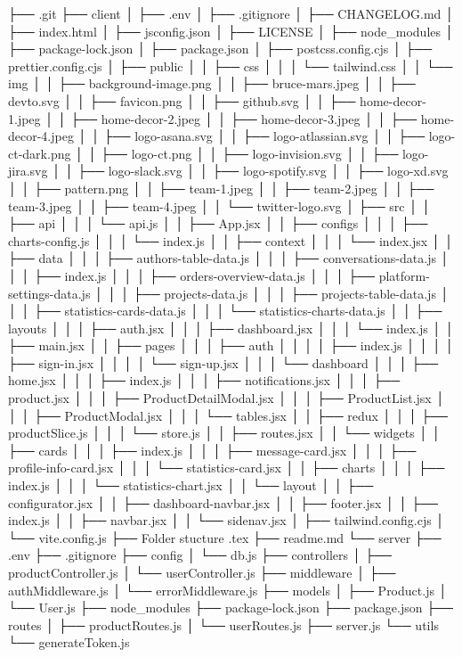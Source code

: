 ├── .git
├── client
│   ├── .env
│   ├── .gitignore
│   ├── CHANGELOG.md
│   ├── index.html
│   ├── jsconfig.json
│   ├── LICENSE
│   ├── node_modules
│   ├── package-lock.json
│   ├── package.json
│   ├── postcss.config.cjs
│   ├── prettier.config.cjs
│   ├── public
│   │   ├── css
│   │   │   └── tailwind.css
│   │   └── img
│   │       ├── background-image.png
│   │       ├── bruce-mars.jpeg
│   │       ├── devto.svg
│   │       ├── favicon.png
│   │       ├── github.svg
│   │       ├── home-decor-1.jpeg
│   │       ├── home-decor-2.jpeg
│   │       ├── home-decor-3.jpeg
│   │       ├── home-decor-4.jpeg
│   │       ├── logo-asana.svg
│   │       ├── logo-atlassian.svg
│   │       ├── logo-ct-dark.png
│   │       ├── logo-ct.png
│   │       ├── logo-invision.svg
│   │       ├── logo-jira.svg
│   │       ├── logo-slack.svg
│   │       ├── logo-spotify.svg
│   │       ├── logo-xd.svg
│   │       ├── pattern.png
│   │       ├── team-1.jpeg
│   │       ├── team-2.jpeg
│   │       ├── team-3.jpeg
│   │       ├── team-4.jpeg
│   │       └── twitter-logo.svg
│   ├── src
│   │   ├── api
│   │   │   └── api.js
│   │   ├── App.jsx
│   │   ├── configs
│   │   │   ├── charts-config.js
│   │   │   └── index.js
│   │   ├── context
│   │   │   └── index.jsx
│   │   ├── data
│   │   │   ├── authors-table-data.js
│   │   │   ├── conversations-data.js
│   │   │   ├── index.js
│   │   │   ├── orders-overview-data.js
│   │   │   ├── platform-settings-data.js
│   │   │   ├── projects-data.js
│   │   │   ├── projects-table-data.js
│   │   │   ├── statistics-cards-data.js
│   │   │   └── statistics-charts-data.js
│   │   ├── layouts
│   │   │   ├── auth.jsx
│   │   │   ├── dashboard.jsx
│   │   │   └── index.js
│   │   ├── main.jsx
│   │   ├── pages
│   │   │   ├── auth
│   │   │   │   ├── index.js
│   │   │   │   ├── sign-in.jsx
│   │   │   │   └── sign-up.jsx
│   │   │   └── dashboard
│   │   │       ├── home.jsx
│   │   │       ├── index.js
│   │   │       ├── notifications.jsx
│   │   │       ├── product.jsx
│   │   │       ├── ProductDetailModal.jsx
│   │   │       ├── ProductList.jsx
│   │   │       ├── ProductModal.jsx
│   │   │       └── tables.jsx
│   │   ├── redux
│   │   │   ├── productSlice.js
│   │   │   └── store.js
│   │   ├── routes.jsx
│   │   └── widgets
│   │       ├── cards
│   │       │   ├── index.js
│   │       │   ├── message-card.jsx
│   │       │   ├── profile-info-card.jsx
│   │       │   └── statistics-card.jsx
│   │       ├── charts
│   │       │   ├── index.js
│   │       │   └── statistics-chart.jsx
│   │       └── layout
│   │           ├── configurator.jsx
│   │           ├── dashboard-navbar.jsx
│   │           ├── footer.jsx
│   │           ├── index.js
│   │           ├── navbar.jsx
│   │           └── sidenav.jsx
│   ├── tailwind.config.cjs
│   └── vite.config.js
├── Folder stucture .tex
├── readme.md
└── server
    ├── .env
    ├── .gitignore
    ├── config
    │   └── db.js
    ├── controllers
    │   ├── productController.js
    │   └── userController.js
    ├── middleware
    │   ├── authMiddleware.js
    │   └── errorMiddleware.js
    ├── models
    │   ├── Product.js
    │   └── User.js
    ├── node_modules
    ├── package-lock.json
    ├── package.json
    ├── routes
    │   ├── productRoutes.js
    │   └── userRoutes.js
    ├── server.js
    └── utils
        └── generateToken.js
